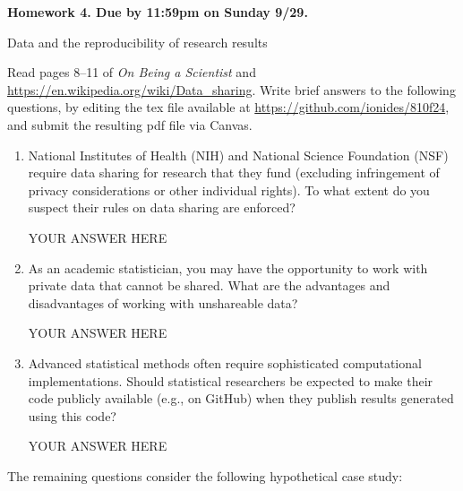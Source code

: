\documentclass[12pt]{article}
\begin{document}
\begin{center}\bf
Homework 4. Due by 11:59pm on Sunday 9/29.

Data and the reproducibility of research results
\end{center}
Read pages 8--11 of {\em On Being a Scientist} and \url{https://en.wikipedia.org/wiki/Data_sharing}. Write brief answers to the following questions, by editing the tex file available at \url{https://github.com/ionides/810f24}, and submit the resulting pdf file via Canvas.

\begin{enumerate}

\item National Institutes of Health (NIH) and National Science Foundation (NSF) require data sharing for research that they fund (excluding infringement of privacy considerations or other individual rights). To what extent do you suspect their rules on data sharing are enforced?

YOUR ANSWER HERE

\item As an academic statistician, you may have the opportunity to work with private data that cannot be shared. What are the advantages and disadvantages of working with unshareable data?
  
YOUR ANSWER HERE
  

\item Advanced statistical methods often require sophisticated computational implementations. Should statistical researchers be expected to make their code publicly available (e.g., on GitHub) when they publish results generated using this code?

YOUR ANSWER HERE

\end{enumerate}
The remaining questions consider the following hypothetical case study:
\end{document}
